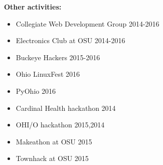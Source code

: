 \documentclass[letterpaper,10pt]{article}
\begin{document}
		{\bf Other activities:}

		\begin{multicols}{3} \raggedright
			\begin{itemize}
				\item Collegiate Web Development Group 2014-2016
				\item Electronics Club at OSU 2014-2016
				\item Buckeye Hackers 2015-2016
				\item Ohio LinuxFest 2016
				\item PyOhio 2016
				\item Cardinal Health hackathon 2014
				\item OHI/O hackathon 2015,2014
				\item Makeathon at OSU 2015
				\item Townhack at OSU 2015
			\end{itemize}
		\end{multicols}
		
\end{document}
